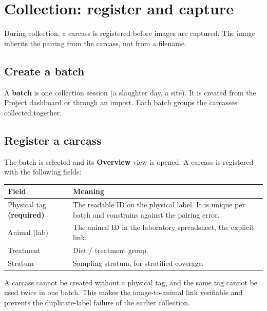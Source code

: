 \chapter{Collection: register and capture}


\vspace{4pt}
During collection, a carcass is registered before images are captured. The image
inherits the pairing from the carcass, not from a filename.

\section{Create a batch}

A \textbf{batch} is one collection session (a slaughter day, a site). It is
created from the Project dashboard or through an import. Each batch groups the
carcasses collected together.

\section{Register a carcass}

The batch is selected and its \textbf{Overview} view is opened. A carcass is
registered with the following fields:

\begin{center}
\begin{tabularx}{\linewidth}{@{}l X@{}}
\toprule
\textbf{Field} & \textbf{Meaning} \\
\midrule
Physical tag \textbf{(required)} & The readable ID on the physical label. It is
      unique per batch and constrains against the pairing error. \\
Animal (lab) & The animal ID in the laboratory spreadsheet, the explicit link. \\
Treatment & Diet / treatment group. \\
Stratum & Sampling stratum, for stratified coverage. \\
\bottomrule
\end{tabularx}
\end{center}

\begin{caution}[title=The physical tag is mandatory]
A carcass cannot be created without a physical tag, and the same tag cannot be
used twice in one batch. This makes the image-to-animal link verifiable and
prevents the duplicate-label failure of the earlier collection.
\end{caution}

